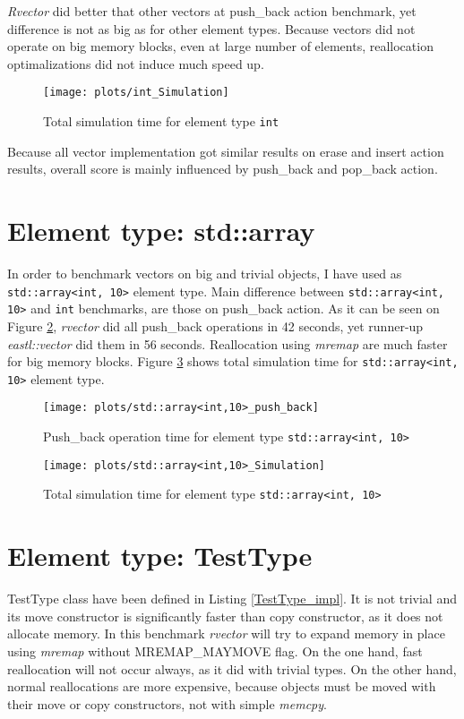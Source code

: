 \documentclass[inz, english, shortabstract]{iithesis}
\begin{document}
{\it Rvector} did better that other vectors at push\_back action benchmark, yet difference is not as big as for other element types. Because vectors did not operate on big memory blocks, even at large number of elements, reallocation optimalizations did not induce much speed up.

\begin{figure}[h!]
\caption{Total simulation time for element type \lstinline{int}}
\label{int_simulation}
\texttt{[image: plots/int\_Simulation]}
\end{figure}

Because all vector implementation got similar results on erase and insert action results, overall score is mainly influenced by push\_back and pop\_back action.

\section{Element type: std::array}
In order to benchmark vectors on big and trivial objects, I have used as \lstinline{std::array<int, 10>} element type. Main difference between \lstinline{std::array<int, 10>} and \lstinline{int} benchmarks, are those on push\_back action. As it can be seen on Figure \ref{array_push_back}, {\it rvector} did all push\_back operations in 42 seconds, yet runner-up {\it eastl::vector} did them in 56 seconds. Reallocation using {\it mremap} are much faster for big memory blocks. Figure \ref{array_simulation} shows total simulation time for \lstinline{std::array<int, 10>} element type.

\begin{figure}[h!]
\caption{Push\_back operation time for element type \lstinline{std::array<int, 10>}}
\label{array_push_back}
\texttt{[image: plots/std::array<int,10>\_push\_back]}
\end{figure}

\begin{figure}[h!]
\caption{Total simulation time for element type \lstinline{std::array<int, 10>}}
\label{array_simulation}
\texttt{[image: plots/std::array<int,10>\_Simulation]}
\end{figure}

\clearpage
\section{Element type: TestType}
TestType class have been defined in Listing \ref{TestType_impl}. It is not trivial and its move constructor is significantly faster than copy constructor, as it does not allocate memory. In this benchmark  {\it rvector} will try to expand memory in place using {\it mremap} without MREMAP\_MAYMOVE flag. On the one hand, fast reallocation will not occur always, as it did with trivial types. On the other hand, normal reallocations are more expensive, because objects must be moved with their move or copy constructors, not with simple {\it memcpy}.
\end{document}
